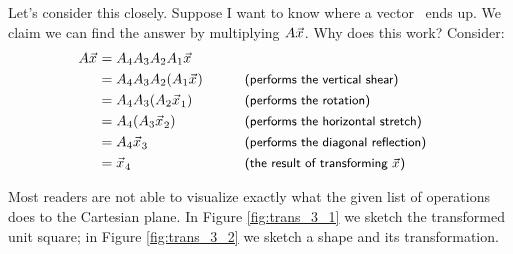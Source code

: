 {Let's consider this closely. Suppose I want to know where a vector \vx\ ends up. We claim we can find the answer by multiplying $A\vec{x_{}}$. Why does this work? Consider:
\enlargethispage{2\baselineskip}
\begin{align*}
\tta\vx &= \tta_4\tta_3\tta_2\tta_1\vx \\
				&= \tta_4\tta_3\tta_2(\tta_1\vx) & &\textsf{\hskip 20pt  \small(performs the vertical shear)}\hfill \\
				&= \tta_4\tta_3(\tta_2\vx_1) & &\textsf{\hskip 20pt  \small(performs the rotation)}\hfill\\
				&= \tta_4(\tta_3\vx_2) & &\textsf{\hskip 20pt  \small(performs the horizontal stretch)}\hfill\\
				&= \tta_4\vx_3 & &\textsf{\hskip 20pt  \small(performs the diagonal reflection)}\hfill\\
				&= \vx_4 & &\textsf{\hskip 20pt  \small(the result of transforming $\vx$)}\hfill \\
\end{align*}

Most readers are not able to visualize exactly what the given list of operations does to the Cartesian plane. In Figure \ref{fig:trans_3_1} we sketch the transformed unit square; in Figure \ref{fig:trans_3_2} we sketch a shape and its transformation.

\begin{myfigure}
\begin{center}
\end{center}
\label{fig:trans_3_1}
\end{myfigure}

\begin{myfigure}
\begin{center}
\end{center}
\label{fig:trans_3_2}
\end{myfigure}
\baselineskip}\\


